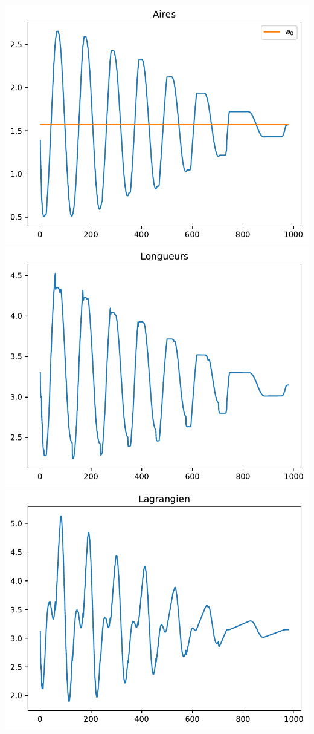 \documentclass[11pt,envcountsect,aspectratio=169]{beamer} %
\begin{document}
\begin{frame}
\begin{center}
{        \includegraphics[scale=\echelle]{../res/test_aires}
        \includegraphics[scale=\echelle]{../res/test_longueurs}
        \includegraphics[scale=\echelle]{../res/test_lagrangien}
    }


\end{center}
\end{frame}
\end{document}

